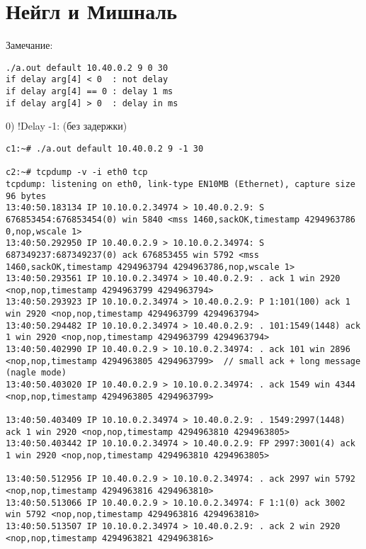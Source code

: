 \documentclass[a4paper,12pt]{article}
\begin{document}
\section{Нейгл и Мишналь}

Замечание:
\begin{lstlisting}
./a.out default 10.40.0.2 9 0 30
if delay arg[4] < 0  : not delay
if delay arg[4] == 0 : delay 1 ms
if delay arg[4] > 0  : delay in ms
\end{lstlisting}

0) !Delay -1: (без задержки)
\begin{lstlisting}
c1:~# ./a.out default 10.40.0.2 9 -1 30

c2:~# tcpdump -v -i eth0 tcp
tcpdump: listening on eth0, link-type EN10MB (Ethernet), capture size 96 bytes
13:40:50.183134 IP 10.10.0.2.34974 > 10.40.0.2.9: S 676853454:676853454(0) win 5840 <mss 1460,sackOK,timestamp 4294963786 0,nop,wscale 1>
13:40:50.292950 IP 10.40.0.2.9 > 10.10.0.2.34974: S 687349237:687349237(0) ack 676853455 win 5792 <mss 1460,sackOK,timestamp 4294963794 4294963786,nop,wscale 1>
13:40:50.293561 IP 10.10.0.2.34974 > 10.40.0.2.9: . ack 1 win 2920 <nop,nop,timestamp 4294963799 4294963794>
13:40:50.293923 IP 10.10.0.2.34974 > 10.40.0.2.9: P 1:101(100) ack 1 win 2920 <nop,nop,timestamp 4294963799 4294963794>
13:40:50.294482 IP 10.10.0.2.34974 > 10.40.0.2.9: . 101:1549(1448) ack 1 win 2920 <nop,nop,timestamp 4294963799 4294963794>
13:40:50.402990 IP 10.40.0.2.9 > 10.10.0.2.34974: . ack 101 win 2896 <nop,nop,timestamp 4294963805 4294963799>  // small ack + long message (nagle mode)
13:40:50.403020 IP 10.40.0.2.9 > 10.10.0.2.34974: . ack 1549 win 4344 <nop,nop,timestamp 4294963805 4294963799>

13:40:50.403409 IP 10.10.0.2.34974 > 10.40.0.2.9: . 1549:2997(1448) ack 1 win 2920 <nop,nop,timestamp 4294963810 4294963805>
13:40:50.403442 IP 10.10.0.2.34974 > 10.40.0.2.9: FP 2997:3001(4) ack 1 win 2920 <nop,nop,timestamp 4294963810 4294963805>

13:40:50.512956 IP 10.40.0.2.9 > 10.10.0.2.34974: . ack 2997 win 5792 <nop,nop,timestamp 4294963816 4294963810>
13:40:50.513066 IP 10.40.0.2.9 > 10.10.0.2.34974: F 1:1(0) ack 3002 win 5792 <nop,nop,timestamp 4294963816 4294963810>
13:40:50.513507 IP 10.10.0.2.34974 > 10.40.0.2.9: . ack 2 win 2920 <nop,nop,timestamp 4294963821 4294963816>
\end{lstlisting}
\end{document}
